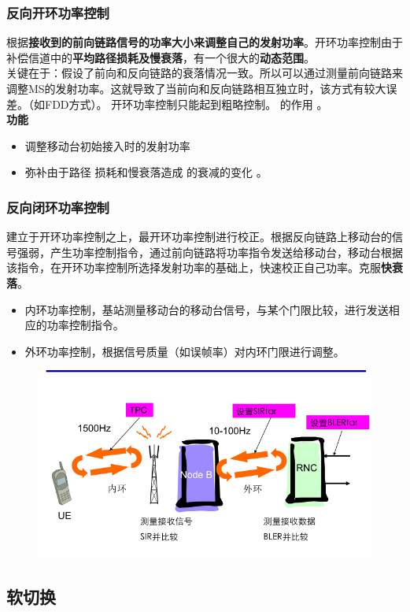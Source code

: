 \subsubsection{反向开环功率控制}
根据\textbf{接收到的前向链路信号的功率大小来调整自己的发射功率}。开环功率控制由于补偿信道中的\textbf{平均路径损耗及慢衰落}，有一个很大的\textbf{动态范围}。\\
关键在于：假设了前向和反向链路的衰落情况一致。所以可以通过测量前向链路来调整MS的发射功率。这就导致了当前向和反向链路相互独立时，该方式有较大误差。（如FDD方式）。
开环功率控制只能起到粗略控制。
的作用 。\\
\textbf{功能}
\begin{itemize}
	\item 调整移动台初始接入时的发射功率
	\item 弥补由于路径 损耗和慢衰落造成 的衰减的变化 。
\end{itemize}
\subsubsection{反向闭环功率控制}
建立于开环功率控制之上，最开环功率控制进行校正。根据反向链路上移动台的信号强弱，产生功率控制指令，通过前向链路将功率指令发送给移动台，移动台根据该指令，在开环功率控制所选择发射功率的基础上，快速校正自己功率。克服\textbf{快衰落}。
\begin{itemize}
	\item 内环功率控制，基站测量移动台的移动台信号，与某个门限比较，进行发送相应的功率控制指令。
	\item 外环功率控制，根据信号质量（如误帧率）对内环门限进行调整。
\end{itemize}
\begin{figure}[H]
	\centering
	\includegraphics[width=0.7\linewidth]{figures/screenshot018}
	\caption{}
	\label{fig:screenshot018}
\end{figure}

\subsection{软切换}
